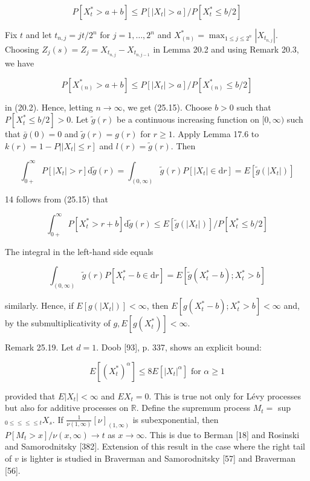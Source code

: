 \documentclass[a4paper,11pt]{article}
\begin{document}
\begin{equation*}
    P\left[X_{t}^{*}>a+b\right] \leq P\left[\left|X_{t}\right|>a\right] / P\left[X_{t}^{*} \leq b / 2\right] \tag{25.15}
\end{equation*}

Fix $t$ and let $t_{n, j}=j t / 2^{n}$ for $j=1, \ldots, 2^{n}$ and $X_{(n)}^{*}=\max _{1 \leq j \leq 2^{n}}\left|X_{t_{n, j}}\right|$. Choosing $Z_{j}(s)=Z_{j}=X_{t_{n, j}}-X_{t_{n, j-1}}$ in Lemma 20.2 and using Remark 20.3, we have

$$
    P\left[X_{(n)}^{*}>a+b\right] \leq P\left[\left|X_{t}\right|>a\right] / P\left[X_{(n)}^{*} \leq b / 2\right]
$$

in (20.2). Hence, letting $n \rightarrow \infty$, we get (25.15).
Choose $b>0$ such that $P\left[X_{t}^{*} \leq b / 2\right]>0$.
Let $\tilde{g}(r)$ be a continuous increasing function on $[0, \infty)$
                such that $\bar{g}(0)=0$ and $\tilde{g}(r)=g(r)$ for $r \geq 1$.
                Apply Lemma 17.6 to $\left.k(r)=1-P|| X_{t} \mid \leq r\right]$ and $l(r)=\tilde{g}(r)$. Then

$$
    \int_{0+}^{\infty} P\left[\left|X_{t}\right|>r\right] \mathrm{d} \tilde{g}(r)=\int_{(0, \infty)} \tilde{g}(r) P\left[\left|X_{t}\right| \in \mathrm{d} r\right]=E\left[\widetilde{g}\left(\left|X_{t}\right|\right)\right]
$$

14 follows from (25.15) that

$$
    \int_{0+}^{\infty} P\left[X_{t}^{*}>r+b\right] \mathrm{d} \widetilde{g}(r) \leq E\left[\widetilde{g}\left(\left|X_{t}\right|\right)\right] / P\left[X_{t}^{*} \leq b / 2\right]
$$

The integral in the left-hand side equals

$$
    \int_{(0, \infty)} \tilde{g}(r) P\left[X_{t}^{*}-b \in \mathrm{d} r\right]=E\left[\tilde{g}\left(X_{t}^{*}-b\right) ; X_{t}^{*}>b\right]
$$

similarly. Hence, if $E\left[g\left(\left|X_{t}\right|\right)\right]<\infty$,
then $E\left[g\left(X_{t}^{*}-b\right) ; X_{t}^{*}>b\right]<\infty$ and,
by the submultiplicativity of $g, E\left[g\left(X_{t}^{*}\right)\right]<\infty$. \\



Remark 25.19. Let $d=1$. Doob [93], p. 337, shows an explicit bound:

\begin{equation*}
    E\left[\left(X_{t}^{*}\right)^{\alpha}\right] \leq 8 E\left[\left|X_{t}\right|^{\alpha}\right] \text { for } \alpha \geq 1 \tag{25.16}
\end{equation*}


provided that $E\left|X_{t}\right|<\infty$ and $E X_{t}=0$. This is true not only for Lévy processes but also
for additive processes on $\mathbb{R}$. Define the supremum process $M_{t}=$ sup $_{0 \leq \leq \leq \leq t} X_{s}$.
If $\frac{1}{\nu(1, \infty)}[\nu]_{(1, \infty)}$ is subexponential,
then $P\left[M_{t}>x\right] / \nu(x, \infty) \rightarrow t$ as $x \rightarrow \infty$.
This is due to Berman [18] and Rosinski and Samorodnitsky [382]. Extension of this result in the case
where the right tail of $v$ is lighter is studied in Braverman and Samorodnitsky [57] and Braverman [56].
\end{document}
